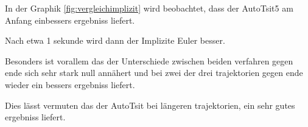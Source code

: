 In der Graphik \ref{fig:vergleichimplizit} wird beobachtet,
dass der AutoTsit5 am Anfang einbessers ergebniss liefert.

Nach etwa 1 sekunde wird dann der Implizite Euler besser.

Besonders ist vorallem das der Unterschiede zwischen beiden verfahren gegen ende sich sehr stark null annähert und bei zwei der drei trajektorien gegen ende wieder ein bessers ergebniss liefert.

Dies lässt vermuten das der AutoTsit bei längeren trajektorien, ein sehr gutes ergebniss liefert.











